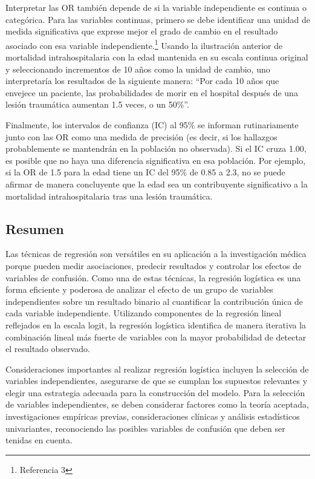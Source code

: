 \documentclass[12pt]{article}
\begin{document}
Interpretar las OR tambi\'en depende de si la variable independiente es continua o categ\'orica. Para las variables continuas, primero se debe identificar una unidad de medida significativa que exprese mejor el grado de cambio en el resultado asociado con esa variable independiente.\footnote{Referencia 3} Usando la ilustraci\'on anterior de mortalidad intrahospitalaria con la edad mantenida en su escala continua original y seleccionando incrementos de 10 a\~nos como la unidad de cambio, uno interpretar\'ia los resultados de la siguiente manera: ``Por cada 10 a\~nos que envejece un paciente, las probabilidades de morir en el hospital despu\'es de una lesi\'on traum\'atica aumentan 1.5 veces, o un 50\%''.

Finalmente, los intervalos de confianza (IC) al 95\% se informan rutinariamente junto con las OR como una medida de precisi\'on (es decir, si los hallazgos probablemente se mantendr\'an en la poblaci\'on no observada). Si el IC cruza 1.00, es posible que no haya una diferencia significativa en esa poblaci\'on. Por ejemplo, si la OR de 1.5 para la edad tiene un IC del 95\% de 0.85 a 2.3, no se puede afirmar de manera concluyente que la edad sea un contribuyente significativo a la mortalidad intrahospitalaria tras una lesi\'on traum\'atica.


\subsection{Resumen}

Las t\'ecnicas de regresi\'on son vers\'atiles en su aplicaci\'on a la investigaci\'on m\'edica porque pueden medir asociaciones, predecir resultados y controlar los efectos de variables de confusi\'on. Como una de estas t\'ecnicas, la regresi\'on log\'istica es una forma eficiente y poderosa de analizar el efecto de un grupo de variables independientes sobre un resultado binario al cuantificar la contribuci\'on \'unica de cada variable independiente. Utilizando componentes de la regresi\'on lineal reflejados en la escala logit, la regresi\'on log\'istica identifica de manera iterativa la combinaci\'on lineal m\'as fuerte de variables con la mayor probabilidad de detectar el resultado observado. 

Consideraciones importantes al realizar regresi\'on log\'istica incluyen la selecci\'on de variables independientes, asegurarse de que se cumplan los supuestos relevantes y elegir una estrategia adecuada para la construcci\'on del modelo. Para la selecci\'on de variables independientes, se deben considerar factores como la teor\'ia aceptada, investigaciones emp\'iricas previas, consideraciones cl\'inicas y an\'alisis estad\'isticos univariantes, reconociendo las posibles variables de confusi\'on que deben ser tenidas en cuenta.
\end{document}
